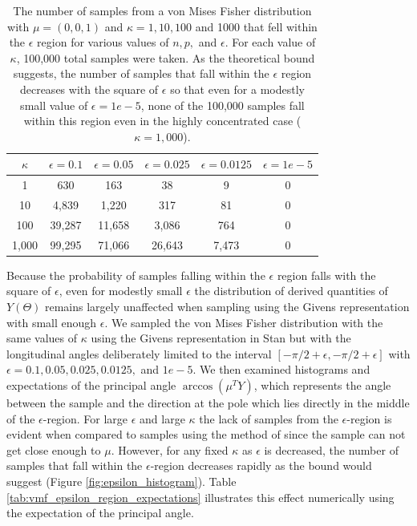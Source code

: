 \documentclass[ba]{imsart}
\numberwithin{equation}{section}
\theoremstyle{plain}
\begin{document}
\begin{table}
\begin{tabular}{|c||ccccc|}
\hline
$\kappa$  & $\epsilon = 0.1$ & $\epsilon = 0.05$ & $\epsilon = 0.025$ & $\epsilon = 0.0125$ & $\epsilon = 1e-5$\\
\hline
\hline
1 & 630 & 163 & 38 & 9 & 0\\
10 & 4,839 & 1,220 & 317 & 81 & 0\\
100 & 39,287 & 11,658 & 3,086 & 764 & 0 \\
1,000  & 99,295 & 71,066 & 26,643 & 7,473 & 0 \\
\hline
\end{tabular}
\caption{The number of samples from a von Mises Fisher distribution with $\mu = (0,0,1)$ and $\kappa = 1, 10, 100$ and 1000 that fell within the $\epsilon$ region for various values of $n, p,$ and $\epsilon$. For each value of $\kappa$, 100,000 total samples were taken. As the theoretical bound suggests, the number of samples that fall within the $\epsilon$ region decreases with the square of $\epsilon$ so that even for a modestly small value of $\epsilon = 1e-5$, none of the 100,000 samples fall within this region even in the highly concentrated case ($\kappa = 1,000$).}
\label{tab:vmf_epsilon_region}
\end{table}

\noindent Because the probability of samples falling within the $\epsilon$ region falls with the square of $\epsilon$, even for modestly small $\epsilon$ the distribution of derived quantities of $Y(\Theta)$ remains largely unaffected when sampling using the Givens representation with small enough $\epsilon$. We sampled the von Mises Fisher distribution with the same values of $\kappa$ using the Givens representation in Stan but with the longitudinal angles deliberately limited to the interval $[-\pi/2 + \epsilon, -\pi/2+\epsilon]$ with $\epsilon = 0.1, 0.05, 0.025, 0.0125,$ and $1e-5$. We then examined histograms and expectations of the principal angle $\arccos (\mu^T Y)$, which represents the angle between the sample and the direction at the pole which lies directly in the middle of the $\epsilon$-region. For large $\epsilon$ and large $\kappa$ the lack of samples from the $\epsilon$-region is evident when compared to samples using the method of \citet{wood1994simulation} since the sample can not get close enough to $\mu$. However, for any fixed $\kappa$ as $\epsilon$ is decreased, the number of samples that fall within the $\epsilon$-region decreases rapidly as the bound would suggest (Figure \ref{fig:epsilon_histogram}). Table \ref{tab:vmf_epsilon_region_expectations} illustrates this effect numerically using the expectation of the principal angle.
\end{document}
